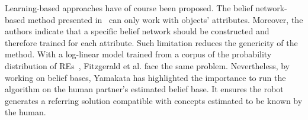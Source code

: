 Learning-based approaches have of course been proposed. The belief network-based method presented in~\cite{yamakata_2004_belief} can only work with objects' attributes. Moreover, the authors indicate that a specific belief network should be constructed and therefore trained for each attribute. Such limitation reduces the genericity of the method. With a log-linear model trained from a corpus of the probability distribution of REs~\cite{fitzgerald_2013_learning}, Fitzgerald et al. face the same problem. Nevertheless, by working on belief bases, Yamakata has highlighted the importance to run the algorithm on the human partner's estimated belief base. It ensures the robot generates a referring solution compatible with concepts estimated to be known by the human.





